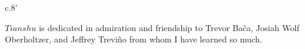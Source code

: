 \documentclass[10pt]{article}
\begin{document}
\vspace*{10\baselineskip}

\begin{center}
c.8'
\end{center}

\vspace*{10\baselineskip}

\begin{center}
$Tianshu$ is dedicated in admiration and friendship to Trevor Ba\v{c}a, Josiah Wolf Oberholtzer, and Jeffrey Trevi\~{n}o from whom I have learned so much.
\rightskip\leftskip
\end{center}
\end{document}
